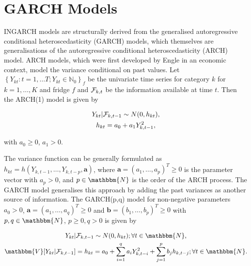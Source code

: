 
\section{GARCH Models}
\label{sec: Garch Models}

INGARCH models are structurally derived from the generalised autoregressive conditional heteroscedasticity (GARCH) models, which themselves are generalisations of the autoregressive conditional heteroscedasticity (ARCH) model. ARCH models, which were first developed by Engle \cite{Engle:1982} in an economic context, model the variance conditional on past values. Let $\left\{Y_{kt}:t=1,\ldots T; Y_{kt} \in \mathbb{N}_0\right\}_f$ be the univariate time series for category $k$ for $k=1,\ldots,K$ and fridge $f$ and $\mathcal{F}_{k,t}$ be the information available at time $t$. Then the ARCH(1) model is given by \cite{Engle:1982}

\begin{equation}
\begin{gathered}
Y_{kt} | \mathcal{F}_{k,t-1} \sim N(0,h_{kt}),\\
h_{kt} = a_0 + a_1 Y_{k,t-1}^2,
\label{eq:ARCH model}
\end{gathered}
\end{equation}

with $a_0\geq0$, $a_1>0$. 

The variance function can be generally formulated as $h_{kt} = h(Y_{k,t-1},\ldots,Y_{k,t-p},\bm{a})$, where $\bm{a}=(a_1,\ldots,a_p)^T\geq 0$ is the parameter vector with $a_p>0$, and $p \in \mathbbm{N}$ is the order of the ARCH process. 
The GARCH model generalises this approach by adding the past variances as another source of information. The GARCH(p,q) model for non-negative parameters $a_0>0$, $\bm{a}=(a_1,\ldots,a_q)^T\geq 0$ and $\bm{b}=(b_1,\ldots,b_p)^T\geq0$ with $p,q \in \mathbbm{N}$, $p\geq0, q>0$ is given by \cite{Bollerslev:1986}

\begin{equation}
\begin{gathered}
Y_{kt} | \SigA_{k,t-1} \sim N(0,h_{kt}); \forall t \in \mathbbm{N}, \\
\mathbbm{V}[Y_{kt}|\SigA_{k,t-1}]=h_{kt} = a_0 + \sum_{i=1}^q a_i Y_{k,t-i}^2 + \sum_{j=1}^p b_j h_{k,t-j};\forall t \in \mathbbm{N}.
\label{eq:GARCH model}
\end{gathered}
\end{equation}

